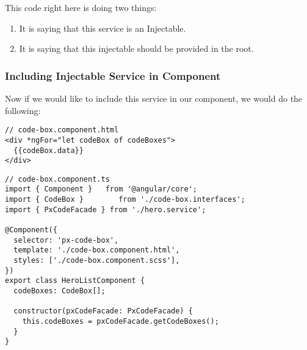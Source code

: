 This code right here is doing two things:
\begin{enumerate}
  \item It is saying that this service is an Injectable.
  \item It is saying that this injectable should be provided in the root.
\end{enumerate}


\subsubsection{ Including Injectable Service in Component }
Now if we would like to include this service in our component, we would do the
following:
\begin{lstlisting}
// code-box.component.html
<div *ngFor="let codeBox of codeBoxes">
  {{codeBox.data}}
</div>
\end{lstlisting}

\begin{lstlisting}
// code-box.component.ts
import { Component }   from '@angular/core';
import { CodeBox }        from './code-box.interfaces';
import { PxCodeFacade } from './hero.service';

@Component({
  selector: 'px-code-box',
  template: './code-box.component.html',
  styles: ['./code-box.component.scss'],
})
export class HeroListComponent {
  codeBoxes: CodeBox[];

  constructor(pxCodeFacade: PxCodeFacade) {
    this.codeBoxes = pxCodeFacade.getCodeBoxes();
  }
}
\end{lstlisting}


